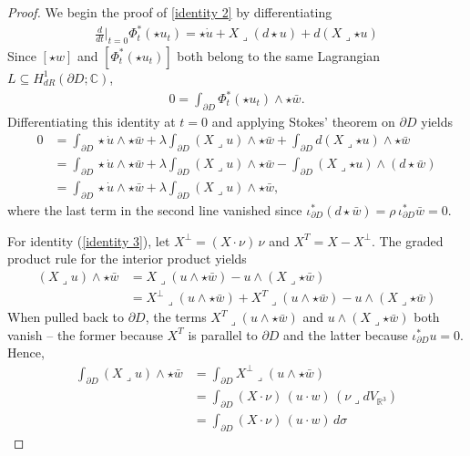 \documentclass[10pt,a4paper]{amsart}
\newcommand{\hodge}{\!\star\!}
\newcommand{\iprod}{\mathbin{\lrcorner}}
\begin{document}
\begin{proof}
We begin the proof of \eqref{identity 2} by differentiating 
\begin{align*}
    \frac{d}{dt}\lvert_{t=0}\Phi_t^\ast (\star u_t)= \star \dot{u} + X\iprod (d\hodge u) + d(X\iprod \star u)
\end{align*}
Since $[\star w]$ and $[\Phi^\ast_t (\star u_t)]$ both belong to the same Lagrangian $L \subseteq H^1_{dR}(\partial D; \mathbb C)$,
\begin{align*}
    0 = \int_{\partial D} \Phi_t^\ast (\star u_t) \wedge \star \bar w.
\end{align*}
Differentiating this identity at $t=0$ and applying Stokes' theorem on $\partial D$ yields
\begin{align*}
    0 &= \int_{\partial D} \star \dot u \wedge \star \bar w+ \lambda \int_{\partial D} (X \iprod u) \wedge \star \bar w  + \int_{\partial D} d ( X \iprod \star u) \wedge \star \bar w  \\
    &= \int_{\partial D} \star \dot u \wedge \star \bar w + \lambda \int_{\partial D} (X \iprod u) \wedge \star \bar w  - \int_{\partial D} (X \iprod \star u) \wedge (d \hodge \bar w)\\
    &= \int_{\partial D} \star \dot u \wedge \star \bar w+ \lambda \int_{\partial D} (X \iprod u) \wedge \star \bar w,
\end{align*}
where the last term in the second line vanished since $\iota_{\partial D}^\ast(d \hodge \bar w) = \rho \, \iota_{\partial D}^\ast \bar w = 0$. 





For identity (\ref{identity 3}), let  $X^\perp = (X\cdot \nu)\, \nu$ and $X^T = X-X^\perp$. The graded product rule for the interior product yields
\begin{align*}
    (X \iprod u) \wedge \star \bar w&= 
    X \iprod (u \wedge \star \bar w) - u \wedge (X \iprod \star \bar w) \\
    &= X^\perp \iprod (u \wedge \star \bar w) + X^T \iprod (u \wedge \star \bar w) - u \wedge (X \iprod \star \bar w)
\end{align*}
When pulled back to $\partial D$, the terms $X^T \iprod ( u \wedge \star \bar w)$ and $u \wedge (X \iprod \star \bar w)$ both vanish -- the former because $X^T$ is parallel to $\partial D$ and the latter because $\iota_{\partial D}^\ast u = 0$. Hence,
\begin{align*}
    \int_{\partial D} (X \iprod u) \wedge \star \bar w & = \int_{\partial D} X^\perp \iprod (u \wedge \star \bar w) \\
    &= \int_{\partial D} (X\cdot \nu)\, ( u \cdot w) \, (\nu \iprod dV_{\mathbb R^3}) \\
    & = \int_{\partial D} (X\cdot \nu)\, ( u \cdot w)\,d\sigma
\end{align*}


\end{proof}
\end{document}
